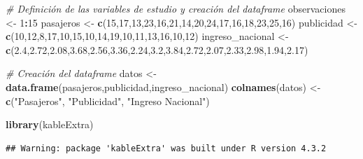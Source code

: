 \documentclass[
]{book}
\newenvironment{Shaded}{\begin{snugshade}}{\end{snugshade}}
\newcommand{\CommentTok}[1]{\textcolor[rgb]{0.56,0.35,0.01}{\textit{#1}}}
\newcommand{\DecValTok}[1]{\textcolor[rgb]{0.00,0.00,0.81}{#1}}
\newcommand{\FloatTok}[1]{\textcolor[rgb]{0.00,0.00,0.81}{#1}}
\newcommand{\FunctionTok}[1]{\textcolor[rgb]{0.13,0.29,0.53}{\textbf{#1}}}
\newcommand{\NormalTok}[1]{#1}
\newcommand{\OtherTok}[1]{\textcolor[rgb]{0.56,0.35,0.01}{#1}}
\newcommand{\SpecialCharTok}[1]{\textcolor[rgb]{0.81,0.36,0.00}{\textbf{#1}}}
\newcommand{\StringTok}[1]{\textcolor[rgb]{0.31,0.60,0.02}{#1}}
\begin{document}
\begin{Shaded}
\begin{Highlighting}[]
\CommentTok{\# Definición de las variables de estudio y creación del dataframe}
\NormalTok{observaciones }\OtherTok{\textless{}{-}} \DecValTok{1}\SpecialCharTok{:}\DecValTok{15}
\NormalTok{pasajeros }\OtherTok{\textless{}{-}} \FunctionTok{c}\NormalTok{(}\DecValTok{15}\NormalTok{,}\DecValTok{17}\NormalTok{,}\DecValTok{13}\NormalTok{,}\DecValTok{23}\NormalTok{,}\DecValTok{16}\NormalTok{,}\DecValTok{21}\NormalTok{,}\DecValTok{14}\NormalTok{,}\DecValTok{20}\NormalTok{,}\DecValTok{24}\NormalTok{,}\DecValTok{17}\NormalTok{,}\DecValTok{16}\NormalTok{,}\DecValTok{18}\NormalTok{,}\DecValTok{23}\NormalTok{,}\DecValTok{25}\NormalTok{,}\DecValTok{16}\NormalTok{)}
\NormalTok{publicidad }\OtherTok{\textless{}{-}} \FunctionTok{c}\NormalTok{(}\DecValTok{10}\NormalTok{,}\DecValTok{12}\NormalTok{,}\DecValTok{8}\NormalTok{,}\DecValTok{17}\NormalTok{,}\DecValTok{10}\NormalTok{,}\DecValTok{15}\NormalTok{,}\DecValTok{10}\NormalTok{,}\DecValTok{14}\NormalTok{,}\DecValTok{19}\NormalTok{,}\DecValTok{10}\NormalTok{,}\DecValTok{11}\NormalTok{,}\DecValTok{13}\NormalTok{,}\DecValTok{16}\NormalTok{,}\DecValTok{10}\NormalTok{,}\DecValTok{12}\NormalTok{)}
\NormalTok{ingreso\_nacional }\OtherTok{\textless{}{-}} \FunctionTok{c}\NormalTok{(}\FloatTok{2.4}\NormalTok{,}\FloatTok{2.72}\NormalTok{,}\FloatTok{2.08}\NormalTok{,}\FloatTok{3.68}\NormalTok{,}\FloatTok{2.56}\NormalTok{,}\FloatTok{3.36}\NormalTok{,}\FloatTok{2.24}\NormalTok{,}\FloatTok{3.2}\NormalTok{,}\FloatTok{3.84}\NormalTok{,}\FloatTok{2.72}\NormalTok{,}\FloatTok{2.07}\NormalTok{,}\FloatTok{2.33}\NormalTok{,}\FloatTok{2.98}\NormalTok{,}\FloatTok{1.94}\NormalTok{,}\FloatTok{2.17}\NormalTok{)}

\CommentTok{\# Creación del dataframe}
\NormalTok{datos }\OtherTok{\textless{}{-}} \FunctionTok{data.frame}\NormalTok{(pasajeros,publicidad,ingreso\_nacional)}
\FunctionTok{colnames}\NormalTok{(datos) }\OtherTok{\textless{}{-}} \FunctionTok{c}\NormalTok{(}\StringTok{"Pasajeros"}\NormalTok{, }\StringTok{"Publicidad"}\NormalTok{, }\StringTok{"Ingreso Nacional"}\NormalTok{)}

\FunctionTok{library}\NormalTok{(kableExtra)}
\end{Highlighting}
\end{Shaded}

\begin{verbatim}
## Warning: package 'kableExtra' was built under R version 4.3.2
\end{verbatim}
\end{document}
